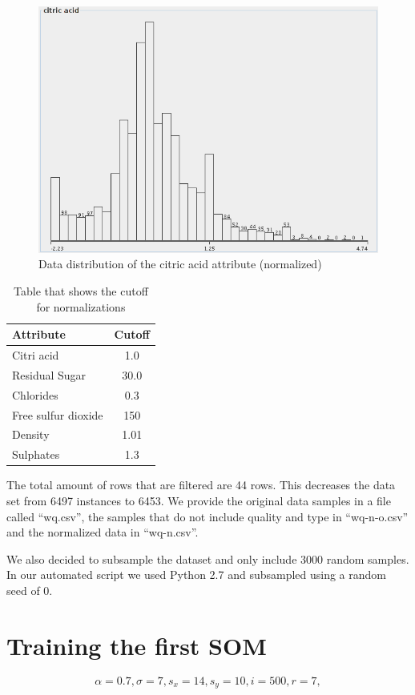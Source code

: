 \documentclass{acm_proc_article-sp}
\begin{document}
\begin{figure}
\centering
\includegraphics[width=\linewidth]{img/ndist-citric-acid}
\caption{Data distribution of the citric acid attribute (normalized)}
\label{fig:ndist-citric-acid}
\end{figure}

\begin{table}
\centering
\begin{tabular}{l|c}
    Attribute & Cutoff \\
    \hline
    \hline
    Citri acid & 1.0 \\
    \hline
    Residual Sugar & 30.0 \\
    \hline
    Chlorides & 0.3 \\
    \hline
    Free sulfur dioxide & 150 \\
    \hline
    Density & 1.01 \\
    \hline
    Sulphates & 1.3 \\
\end{tabular}
\caption{Table that shows the cutoff for normalizations}
\label{tab:cutoff}
\end{table}

The total amount of rows that are filtered are 44 rows. This decreases the data set from 6497 instances to 6453.
We provide the original data samples in a file called ``wq.csv'', the samples that do not include quality and type
in ``wq-n-o.csv'' and the normalized data in ``wq-n.csv''.

We also decided to subsample the dataset and only include 3000 random samples. In our
automated script we used Python 2.7 and subsampled using a random seed of 0.


\section{Training the first SOM}

\[ \alpha = 0.7,
   \sigma = 7,
   s_x = 14,
   s_y=10,
   i=500,
   r = 7, 
\]



\end{document}

